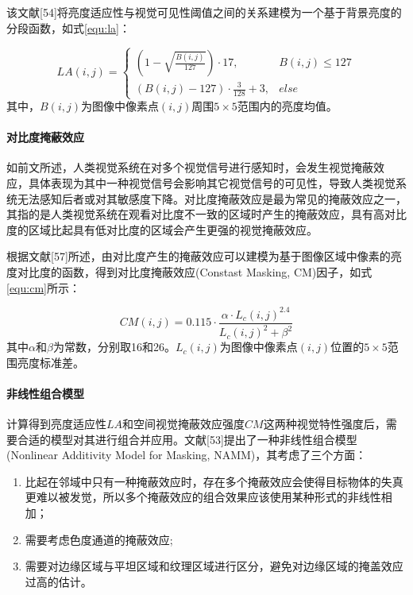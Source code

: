   该文献[54]将亮度适应性与视觉可见性阈值之间的关系建模为一个基于背景亮度的分段函数，如式\ref{equ:la}：

  \begin{equation} \label{equ:la}
    LA(i, j) = \begin{cases}
      \left(1 - \sqrt{\frac{B(i, j)}{127}}\right) \cdot 17, &B(i, j)\leq 127 \\
      \left(B(i, j) - 127\right) \cdot \frac{3}{128} + 3, &else
    \end{cases}
  \end{equation}
  其中，$B(i, j)$为图像中像素点$(i, j)$周围$5\times 5$范围内的亮度均值。

  \paragraph{对比度掩蔽效应} 如前文所述，人类视觉系统在对多个视觉信号进行感知时，会发生视觉掩蔽效  应，具体表现为其中一种视觉信号会影响其它视觉信号的可见性，导致人类视觉系统无法感知后者或对其敏感度下降。对比度掩蔽效应是最为常见的掩蔽效应之一，其指的是人类视觉系统在观看对比度不一致的区域时产生的掩蔽效应，具有高对比度的区域比起具有低对比度的区域会产生更强的视觉掩蔽效应。

  根据文献[57]所述，由对比度产生的掩蔽效应可以建模为基于图像区域中像素的亮度对比度的函数，得到对比度掩蔽效应(Constast Masking, CM)因子，如式\ref{equ:cm}所示：

  \begin{equation} \label{equ:cm}
    CM(i, j) = 0.115 \cdot \frac{\alpha \cdot L_c(i, j)^{2.4}}{L_c(i, j)^2 + \beta^2}
  \end{equation}
  其中$\alpha$和$\beta$为常数，分别取16和26。$L_c(i, j)$为图像中像素点$(i, j)$位置的$5\times 5$范围亮度标准差。

  \paragraph{非线性组合模型} 计算得到亮度适应性$LA$和空间视觉掩蔽效应强度$CM$这两种视觉特性强度后，需要合适的模型对其进行组合并应用。文献[53]提出了一种非线性组合模型(Nonlinear Additivity Model for Masking, NAMM)，其考虑了三个方面：
  \begin{enumerate} [label=\arabic*)]
    \item 比起在邻域中只有一种掩蔽效应时，存在多个掩蔽效应会使得目标物体的失真更难以被发觉，所以多个掩蔽效应的组合效果应该使用某种形式的非线性相加；
    \item 需要考虑色度通道的掩蔽效应;
    \item 需要对边缘区域与平坦区域和纹理区域进行区分，避免对边缘区域的掩盖效应过高的估计。
  \end{enumerate}

